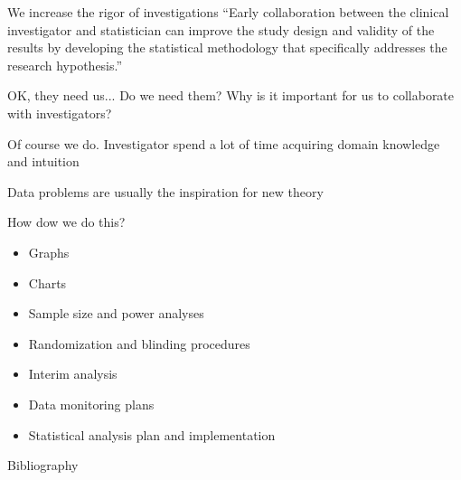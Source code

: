 \documentclass[13pt]{beamer}
\begin{document}
\begin{frame}{We increase the rigor of investigations}
``Early collaboration between the clinical investigator and statistician can 
improve the study design and validity of the results by developing the 
statistical methodology that specifically addresses the research hypothesis.''
\cite{Adams2009}
\end{frame}

\begin{frame}{OK, they need us...  Do we need them?}
Why is it important for us to collaborate with investigators?
\end{frame}

\begin{frame}{Of course we do.}
Investigator spend a lot of time acquiring domain knowledge and intuition

\vspace{0.5cm}

Data problems are usually the inspiration for new theory
\end{frame}

\begin{frame}
\end{frame}

\begin{frame}{How dow we do this?}
\begin{itemize}
\item Graphs
\item Charts
\item Sample size and power analyses
\item Randomization and blinding procedures
\item Interim analysis
\item Data monitoring plans
\item Statistical analysis plan and implementation
\end{itemize} 
\end{frame}

\begin{frame}[allowframebreaks]{Bibliography}


\end{frame}
\end{document}
